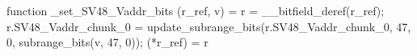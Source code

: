 function _set_SV48_Vaddr_bits (r_ref, v) = {
    r = __bitfield_deref(r_ref);
    r.SV48_Vaddr_chunk_0 = update_subrange_bits(r.SV48_Vaddr_chunk_0, 47, 0, subrange_bits(v, 47, 0));
    (*r_ref) = r
}
